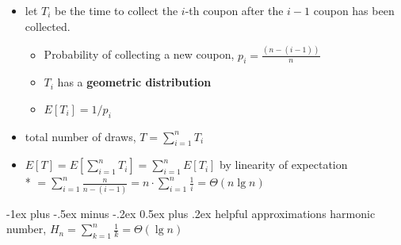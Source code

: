 \documentclass[10pt, landscape]{article}
\makeatletter
\renewcommand{\section}{\@startsection{section}{1}{0mm}%
  {-1ex plus -.5ex minus -.2ex}%
  {0.5ex plus .2ex}%
{\normalfont\large\bfseries}}
\makeatother
\begin{document}
\begin{multicols*}{4}
  \begin{itemize}
    \item let $ T_i $ be the time to collect the $ i $-th coupon after the $ i-1 $ coupon has been collected. 
      \begin{itemize}
        \item Probability of collecting a new coupon, $ p_i = \frac{(n-(i-1))}{n}  $
        \item $ T_i $ has a \textbf{geometric distribution}
        \item $ E[T_i] = 1/p_i $
      \end{itemize}
    \item total number of draws, $ T = \sum\limits^n_{i=1} T_i $
    \item $ E[T] = E[\sum\limits^n_{i=1}T_i] = \sum\limits^n_{i=1}E[T_i] $ by linearity of expectation
      \\* $ = \sum\limits^n_{i=1} \frac{n}{n-(i-1)} = n \cdot \sum\limits^n_{i=1} \frac{1}{i} = \Theta(n \lg n) $
  \end{itemize}























\end{multicols*}

\pagebreak

\section{helpful approximations}
harmonic number, $ H_n = \sum\limits_{k=1}^n \frac{1}{k} = \Theta(\lg n) $
\end{document}

